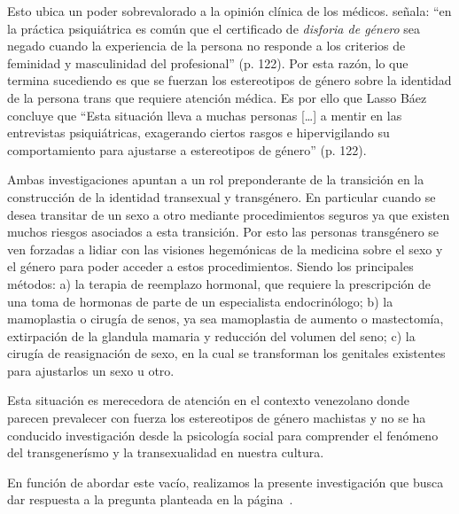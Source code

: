 Esto ubica un poder sobrevalorado a la opinión clínica de los médicos.
\textcite{LassoBaez2014} señala: “en la práctica psiquiátrica es común que el
certificado de \emph{disforia de género} sea negado cuando la experiencia de la
persona no responde a los criterios de feminidad y masculinidad del profesional”
(p. 122). Por esta razón, lo que termina sucediendo es que se fuerzan los
estereotipos de género sobre la identidad de la persona trans que requiere
atención médica. Es por ello que Lasso Báez concluye que “Esta situación lleva a
muchas personas […] a mentir en las entrevistas psiquiátricas, exagerando
ciertos rasgos e hipervigilando su comportamiento para ajustarse a estereotipos
de género” (p. 122).

Ambas investigaciones apuntan a un rol preponderante de la
transición en la construcción de la identidad transexual y transgénero.
En particular cuando se desea transitar de un sexo a otro mediante
procedimientos seguros ya que existen muchos riesgos asociados a esta
transición. Por esto las personas transgénero se ven forzadas a lidiar con las
visiones hegemónicas de la medicina sobre el sexo y el género para poder acceder
a estos procedimientos. Siendo los principales métodos: a) la terapia de
reemplazo hormonal, que requiere la prescripción de una toma de hormonas de
parte de un especialista endocrinólogo; b) la mamoplastia o cirugía de senos, ya
sea mamoplastia de aumento o mastectomía, extirpación de la glandula mamaria y
reducción del volumen del seno; c) la cirugía de reasignación de sexo, en la
cual se transforman los genitales existentes para ajustarlos un sexo u otro.

Esta situación es merecedora de atención en el contexto venezolano donde parecen
prevalecer con fuerza los estereotipos de género machistas y no se ha conducido
investigación desde la psicología social para comprender el fenómeno del
transgenerísmo y la transexualidad en nuestra cultura.

En función de abordar este vacío, realizamos la presente investigación que busca
dar respuesta a la pregunta planteada en la página~\pageref{preguntas}.


